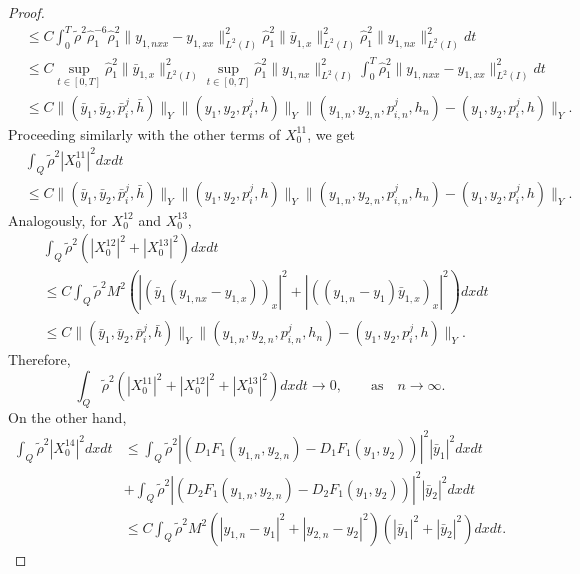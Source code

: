 \documentclass[10pt,a4paper]{amsart}
\begin{document}
\begin{proof}
\begin{equation*}
\begin{split}
            &\leq C \int_0^T \tilde\rho^{2} \hat\rho_1^{-6} \hat\rho_1^2 \|y_{1,nxx}-y_{1,xx}\|_{L^2(I)}^2 \hat\rho_1^2 \|\bar y_{1,x}\|_{L^2(I)}^2 \hat\rho_1^2 \|y_{1,nx}\|_{L^2(I)}^2 dt \\
            &\leq C \sup_{t\in[0,T]} \hat\rho_1^2 \|\bar y_{1,x}\|_{L^2(I)}^2 \sup_{t\in[0,T]} \hat\rho_1^2 \|y_{1,nx}\|_{L^2(I)}^2  \int_0^T \hat\rho_1^2 \|y_{1,nxx}-y_{1,xx}\|_{L^2(I)}^2 dt \\
            &\leq C \|(\bar y_1,\bar y_2,\bar p_i^j,\bar h)\|_{Y} \|(y_1,y_2,p_i^j,h)\|_{{Y}} \| (y_{1,n},y_{2,n},p_{i,n}^j,h_n) - (y_1,y_2,p_i^j,h) \|_{{Y}}.
        \end{split}
    \end{equation*}Proceeding similarly with the other terms of $X_0^{11}$, we get
    \begin{equation*}
        \begin{split}
                &\int_{Q} \tilde\rho^{2}|X_{0}^{11}|^{2} dxdt \\
                &\leq C \|(\bar y_1,\bar y_2,\bar p_i^j,\bar h)\|_{{Y}} \|(y_1,y_2,p_i^j,h)\|_{{Y}} \| (y_{1,n},y_{2,n},p_{i,n}^j,h_n) - (y_1,y_2,p_i^j,h) \|_{{Y}}.
        \end{split}
    \end{equation*}Analogously, for $X_0^{12}$ and $X_0^{13}$, 
    \begin{equation*}
        \begin{split}
            &\int_{Q} \tilde\rho^{2} (|X_{0}^{12}|^{2} + |X_{0}^{13}|^{2} )dxdt\\
            &\leq C\int_{Q} \tilde\rho^{2} M^2 \left( |(\bar y_1 (y_{1,nx}-y_{1,x}))_x|^2 + |((y_{1,n}-y_1) \bar y_{1,x})_x|^{2} \right) dxdt \\
            &\leq C\|(\bar y_1,\bar y_2,\bar p_i^j,\bar h)\|_{{Y}} \| (y_{1,n},y_{2,n},p_{i,n}^j,h_n) - (y_1,y_2,p_i^j,h) \|_{{Y}}.
        \end{split}
    \end{equation*}
    Therefore,
    \begin{equation*}
        \int_{Q} \tilde\rho^{2} (|X_{0}^{11}|^{2} + |X_{0}^{12}|^{2} + |X_{0}^{13}|^{2} )dxdt \to 0, \qquad\text{as}\quad n\to \infty.
    \end{equation*}
    On the other hand,
    \begin{equation*}
        \begin{split}
        	\int_{Q} \tilde\rho^{2} |X_{0}^{14}|^{2} dxdt&\leq  \int_{Q} \tilde\rho^{2} |(D_1 F_1(y_{1,n},y_{2,n})-D_1 F_1(y_1,y_2))|^2 |\bar y_1|^{2}dxdt\\
            & + \int_{Q} \tilde\rho^{2} |(D_2 F_1(y_{1,n},y_{2,n})-D_2 F_1(y_1,y_2))|^2 |\bar y_2|^{2}dxdt\\
        	&\leq C\int_{Q} \tilde\rho^{2} M^2 ( |y_{1,n}-y_1|^2 + |y_{2,n}-y_2|^2 ) (|\bar y_1|^{2} + |\bar y_2|^{2} ) dxdt.
        \end{split}
    \end{equation*}
    

\end{proof}
\end{document}
